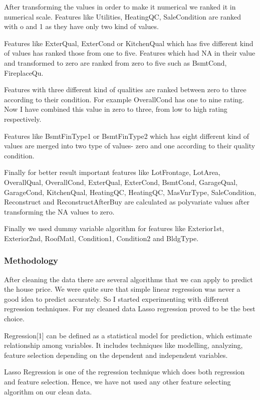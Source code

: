 \documentclass[fleqn,10pt]{SelfArx} %
\begin{document}
After transforming the values in order to make it numerical we ranked it in numerical scale. Features like Utilities, HeatingQC, SaleCondition are ranked with o and 1 as they have only two kind of values.

Features like ExterQual, ExterCond or KitchenQual which has five different kind of values has ranked those from one to five. Features which had NA in their value and transformed to zero are ranked from zero to five such as BsmtCond, FireplaceQu.

Features with three different kind of qualities are ranked between zero to three according to their condition. For example OverallCond has one to nine rating. Now I have combined this value in zero to three, from low to high rating respectively.

Features like BsmtFinType1 or BsmtFinType2 which has eight different kind of values are merged into two type of values- zero and one according to their quality condition.

Finally for better result important features like LotFrontage,	LotArea, OverallQual, OverallCond, ExterQual, ExterCond, BsmtCond, GarageQual, GarageCond, KitchenQual, HeatingQC, HeatingQC, MasVnrType, SaleCondition, Reconstruct and ReconstructAfterBuy are calculated as polyvariate values after transforming the NA values to zero.

Finally we used dummy variable algorithm for features like Exterior1st, Exterior2nd, RoofMatl, Condition1, Condition2 and BldgType. 

\subsubsection{Methodology}

After cleaning the data there are several algorithms that we can apply to predict the house price. We were quite sure that simple linear regression was never a good idea to predict accurately. So I started experimenting with different regression techniques. For my cleaned data Lasso regression proved to be the best choice. 

Regression[1] can be defined as a statistical model for prediction, which estimate relationship among variables. It includes techniques like modelling, analyzing, feature selection depending on the dependent and independent variables.

Lasso Regression is one of the regression technique which does both regression and feature selection. Hence, we have not used any other feature selecting algorithm on our clean data. 
\end{document}

